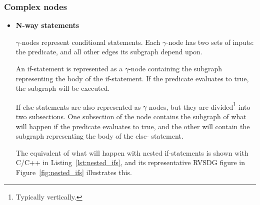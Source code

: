 \subsubsection{Complex nodes}

\begin{itemize}

\item \textbf{N-way statements}

\textit{$\gamma$}-nodes represent conditional statements. Each $\gamma$-node has
two sets of inputs: the predicate, and all other edges its subgraph depend upon.

An if-statement is represented as a $\gamma$-node containing the subgraph
representing the body of the if-statement. If the predicate evaluates to true,
the subgraph will be executed.

If-else statements are also represented as $\gamma$-nodes, but they are
divided\footnote{Typically vertically.} into two subsections. One subsection of
the node contains the subgraph of what will happen if the predicate evaluates to
true, and the other will contain the subgraph representing the body of the else-
statement.

The equivalent of what will happen with nested if-statements is shown with C/C++
in Listing~\ref{lst:nested_ifs}, and its representative RVSDG figure in
Figure~\ref{fig:nested_ifs} illustrates this.


\end{itemize}
